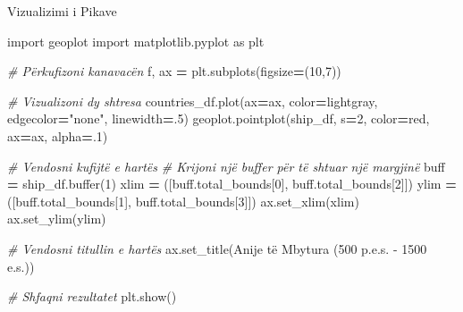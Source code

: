 \documentclass[
  ignorenonframetext,
]{beamer}
\newenvironment{Shaded}{\begin{snugshade}}{\end{snugshade}}
\newcommand{\BuiltInTok}[1]{#1}
\newcommand{\CommentTok}[1]{\textcolor[rgb]{0.56,0.35,0.01}{\textit{#1}}}
\newcommand{\DecValTok}[1]{\textcolor[rgb]{0.00,0.00,0.81}{#1}}
\newcommand{\FloatTok}[1]{\textcolor[rgb]{0.00,0.00,0.81}{#1}}
\newcommand{\ImportTok}[1]{#1}
\newcommand{\NormalTok}[1]{#1}
\newcommand{\OperatorTok}[1]{\textcolor[rgb]{0.81,0.36,0.00}{\textbf{#1}}}
\newcommand{\StringTok}[1]{\textcolor[rgb]{0.31,0.60,0.02}{#1}}
\begin{document}
\begin{frame}[fragile]{Vizualizimi i Pikave}
\protect\hypertarget{vizualizimi-i-pikave}{}

\begin{Shaded}
\begin{Highlighting}[]
\ImportTok{import}\NormalTok{ geoplot}
\ImportTok{import}\NormalTok{ matplotlib.pyplot }\ImportTok{as}\NormalTok{ plt}

\CommentTok{\# Përkufizoni kanavacën}
\NormalTok{f, ax }\OperatorTok{=}\NormalTok{ plt.subplots(figsize}\OperatorTok{=}\NormalTok{(}\DecValTok{10}\NormalTok{,}\DecValTok{7}\NormalTok{))}

\CommentTok{\# Vizualizoni dy shtresa}
\NormalTok{countries\_df.plot(ax}\OperatorTok{=}\NormalTok{ax, color}\OperatorTok{=}\StringTok{\textquotesingle{}lightgray\textquotesingle{}}\NormalTok{, edgecolor}\OperatorTok{=}\StringTok{"none"}\NormalTok{, linewidth}\OperatorTok{=}\FloatTok{.5}\NormalTok{)}
\NormalTok{geoplot.pointplot(ship\_df, s}\OperatorTok{=}\DecValTok{2}\NormalTok{, color}\OperatorTok{=}\StringTok{\textquotesingle{}red\textquotesingle{}}\NormalTok{, ax}\OperatorTok{=}\NormalTok{ax, alpha}\OperatorTok{=}\FloatTok{.1}\NormalTok{)}

\CommentTok{\# Vendosni kufijtë e hartës}
\CommentTok{\# Krijoni një buffer për të shtuar një margjinë}
\NormalTok{buff }\OperatorTok{=}\NormalTok{ ship\_df.}\BuiltInTok{buffer}\NormalTok{(}\DecValTok{1}\NormalTok{)}
\NormalTok{xlim }\OperatorTok{=}\NormalTok{ ([buff.total\_bounds[}\DecValTok{0}\NormalTok{], buff.total\_bounds[}\DecValTok{2}\NormalTok{]])}
\NormalTok{ylim }\OperatorTok{=}\NormalTok{ ([buff.total\_bounds[}\DecValTok{1}\NormalTok{], buff.total\_bounds[}\DecValTok{3}\NormalTok{]])}
\NormalTok{ax.set\_xlim(xlim)}
\NormalTok{ax.set\_ylim(ylim)}

\CommentTok{\# Vendosni titullin e hartës}
\NormalTok{ax.set\_title(}\StringTok{\textquotesingle{}Anije të Mbytura (500 p.e.s. {-} 1500 e.s.)\textquotesingle{}}\NormalTok{)}

\CommentTok{\# Shfaqni rezultatet}
\NormalTok{plt.show()}
\end{Highlighting}
\end{Shaded}
\end{frame}
\end{document}
